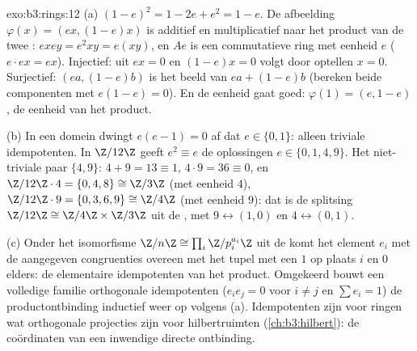 \begin{solution}{exo:b3:rings:12}
(a) $(1-e)^2 = 1 - 2e + e^2 = 1 - e$. De afbeelding $\varphi(x) =
(ex, (1-e)x)$ is additief en multiplicatief naar het product van
de twee : $exey = e^2xy = e(xy)$, en $Ae$ is een
commutatieve ring met eenheid $e$ ($e\cdot ex = ex$). Injectief:
uit $ex = 0$ en $(1-e)x = 0$ volgt door optellen $x = 0$.
Surjectief: $(ea, (1-e)b)$ is het beeld van $ea + (1-e)b$
(bereken beide componenten met $e(1-e) = 0$). En de eenheid gaat
goed: $\varphi(1) = (e, 1-e)$, de eenheid van het product.

(b) In een domein dwingt $e(e - 1) = 0$ af dat $e \in \{0, 1\}$:
alleen triviale idempotenten. In $\Z/12\Z$ geeft $e^2 \equiv e$ de
oplossingen $e \in \{0, 1, 4, 9\}$. Het niet-triviale paar $\{4,
9\}$: $4 + 9 = 13 \equiv 1$, $4\cdot9 = 36 \equiv 0$, en
$\Z/12\Z\cdot4 = \{0, 4, 8\} \cong \Z/3\Z$ (met eenheid $4$),
$\Z/12\Z\cdot9 = \{0, 3, 6, 9\} \cong \Z/4\Z$ (met eenheid $9$):
dat is de splitsing $\Z/12\Z \cong \Z/4\Z\times\Z/3\Z$ uit de
, met $9 \leftrightarrow (1, 0)$ en $4
\leftrightarrow (0, 1)$.

(c) Onder het isomorfisme $\Z/n\Z \cong \prod_i \Z/p_i^{a_i}\Z$
uit de  komt het element $e_i$ met de
aangegeven congruenties overeen met het tupel met een $1$ op
plaats $i$ en $0$ elders: de elementaire idempotenten van het
product. Omgekeerd bouwt een volledige familie orthogonale
idempotenten ($e_ie_j = 0$ voor $i \neq j$ en $\sum e_i = 1$) de
productontbinding inductief weer op volgens (a). Idempotenten zijn
voor ringen wat orthogonale projecties zijn voor hilbertruimten
(\cref{ch:b3:hilbert}): de coördinaten van een inwendige directe
ontbinding.
\end{solution}

